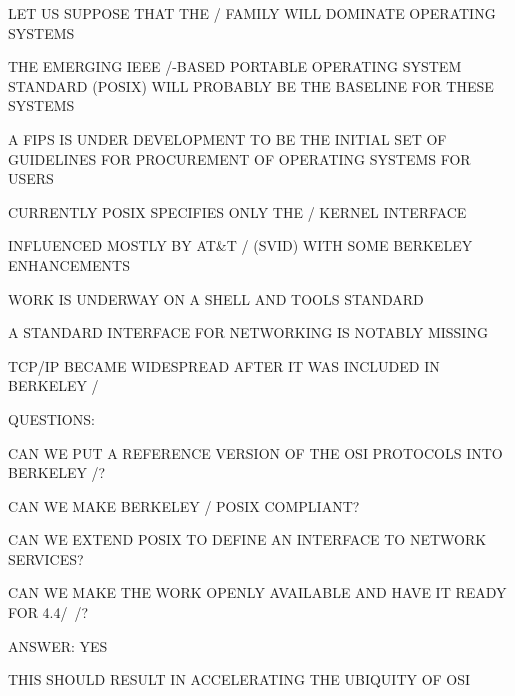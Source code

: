 \begin{bwslide}

\begin{nrtc}
\item	LET US SUPPOSE THAT THE \unix/ FAMILY WILL DOMINATE OPERATING SYSTEMS

\item	THE EMERGING IEEE \unix/-BASED PORTABLE OPERATING SYSTEM
	STANDARD (POSIX) WILL PROBABLY BE THE BASELINE FOR THESE SYSTEMS

\item	A FIPS IS UNDER DEVELOPMENT TO BE THE INITIAL SET OF GUIDELINES FOR
	PROCUREMENT OF OPERATING SYSTEMS FOR USERS
\end{nrtc}
\end{bwslide}


\begin{bwslide}

\begin{nrtc}
\item	CURRENTLY POSIX SPECIFIES ONLY THE \unix/ KERNEL INTERFACE
    \begin{nrtc}
    \item	INFLUENCED MOSTLY BY AT\&T \unix/ (SVID) WITH SOME BERKELEY
		ENHANCEMENTS
    \end{nrtc}

\item	WORK IS UNDERWAY ON A SHELL AND TOOLS STANDARD

\item	A STANDARD INTERFACE FOR NETWORKING IS NOTABLY MISSING
\end{nrtc}
\end{bwslide}


\begin{bwslide}

\begin{nrtc}
\item	TCP/IP BECAME WIDESPREAD AFTER IT WAS INCLUDED IN BERKELEY \unix/

\item	QUESTIONS:
    \begin{nrtc}
    \item	CAN WE PUT A REFERENCE VERSION OF THE OSI PROTOCOLS INTO
		BERKELEY \unix/?

    \item	CAN WE MAKE BERKELEY \unix/ POSIX COMPLIANT?

    \item	CAN WE EXTEND POSIX TO DEFINE AN INTERFACE TO NETWORK SERVICES?

    \item	CAN WE MAKE THE WORK OPENLY AVAILABLE AND HAVE IT READY FOR
		4.4\bsd/~\unix/?
    \end{nrtc}

\item	ANSWER: YES

\item	THIS SHOULD RESULT IN ACCELERATING THE UBIQUITY OF OSI
\end{nrtc}
\end{bwslide}



